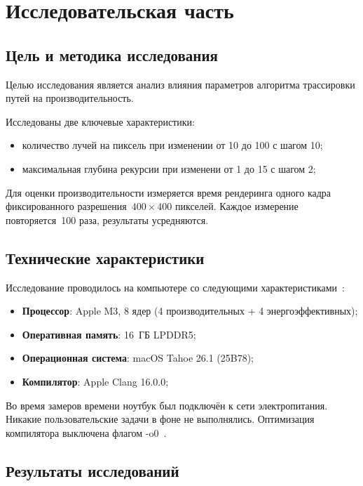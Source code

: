 \section{Исследовательская часть}
\subsection{Цель и методика исследования}

Целью исследования является анализ влияния параметров алгоритма трассировки путей
на производительность.

Исследованы две ключевые характеристики:
\begin{itemize}
    \item количество лучей на пиксель при изменении от 10 до 100 с шагом 10;
    \item максимальная глубина рекурсии при изменени от 1 до 15 с шагом 2;
\end{itemize}

Для оценки производительности измеряется время рендеринга одного кадра фиксированного разрешения~$400 \times 400$ пикселей.
Каждое измерение повторяется~100 раза, результаты усредняются.

\subsection{Технические характеристики}

Исследование проводилось на компьютере со следующими характеристиками~\cite{macbook-m3}:

\begin{itemize}
    \item \textbf{Процессор}: Apple M3, 8 ядер (4 производительных + 4 энергоэффективных);
    \item \textbf{Оперативная память}: 16~ГБ LPDDR5;
    \item \textbf{Операционная система}: macOS Tahoe 26.1 (25B78);
    \item \textbf{Компилятор}: Apple Clang 16.0.0;
\end{itemize}

Во время замеров времени ноутбук был подключён к сети электропитания.
Никакие пользовательские задачи в фоне не выполнялись. Оптимизация компилятора выключена флагом -o0~\cite{compilator-level-optimize}.

\subsection{Результаты исследований}

